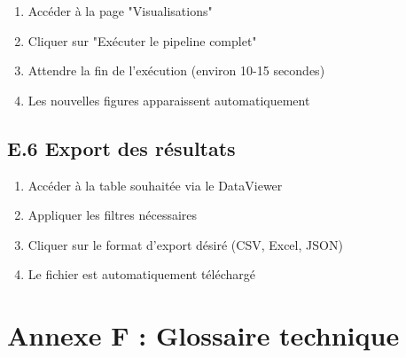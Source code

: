 \begin{enumerate}
    \item Accéder à la page "Visualisations"
    \item Cliquer sur "Exécuter le pipeline complet"
    \item Attendre la fin de l'exécution (environ 10-15 secondes)
    \item Les nouvelles figures apparaissent automatiquement
\end{enumerate}

\subsection*{E.6 Export des résultats}

\begin{enumerate}
    \item Accéder à la table souhaitée via le DataViewer
    \item Appliquer les filtres nécessaires
    \item Cliquer sur le format d'export désiré (CSV, Excel, JSON)
    \item Le fichier est automatiquement téléchargé
\end{enumerate}

\newpage

\section*{Annexe F : Glossaire technique}

